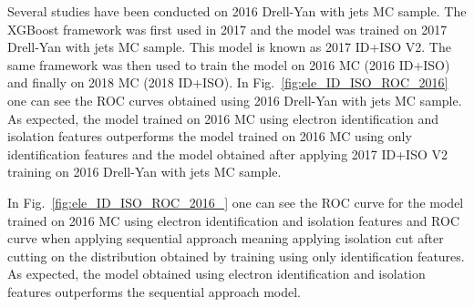 Several studies have been conducted on 2016 Drell-Yan with jets MC sample. The XGBoost framework was first used in 2017 and the model was trained on 2017
Drell-Yan with jets MC sample. This model is known as 2017 ID+ISO V2. The same framework was then used to train the model on 2016 MC (2016 ID+ISO) and finally
on 2018 MC (2018 ID+ISO). In Fig.~\ref{fig:ele_ID_ISO_ROC_2016} one can see the ROC curves obtained using 2016 Drell-Yan with jets MC sample. As expected, the
model trained on 2016 MC using electron identification and isolation features outperforms the model trained on 2016 MC using only identification features and
the model obtained after applying 2017 ID+ISO V2 training on 2016 Drell-Yan with jets MC sample.

In Fig.~\ref{fig:ele_ID_ISO_ROC_2016_} one can see the ROC curve for the model trained on 2016 MC using electron identification and isolation features and ROC
curve when applying sequential approach meaning applying isolation cut after cutting on the distribution obtained by training using only identification features.
As expected, the model obtained using electron identification and isolation features outperforms the sequential approach model.

